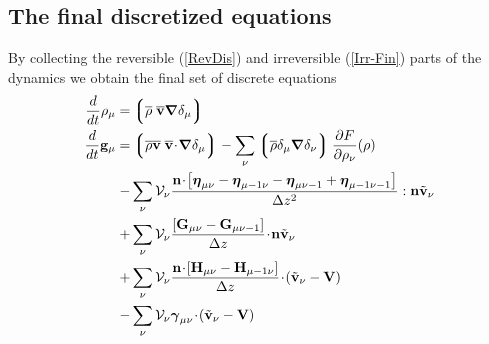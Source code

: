\documentclass[b5paper,openright,11pt]{book}
\newcommand{\esc}{\!\cdot\!}
\newcommand{\llg}{\left\lgroup}
\newcommand{\rlg}{\right\rgroup}
\begin{document}
\subsection{The final discretized equations}
By   collecting  the   reversible   (\ref{RevDis})  and   irreversible
(\ref{Irr-Fin})  parts of  the dynamics  we  obtain the  final set  of
discrete equations
\begin{align}
\frac{d}{dt}\rho_\mu=&  \llg\overline{\rho} \; \overline{\bf v}\boldsymbol{\nabla}\delta_\mu \rlg
\nonumber\\
\frac{d}{dt}{\bf g}_\mu=&
\llg\overline{\rho} \overline{\bf v}\;\overline{\bf v}\esc\boldsymbol{\nabla}\delta_{\mu}\rlg
-\sum_\nu\llg\overline{\rho}\delta_{\mu}\boldsymbol{\nabla}\delta_{\nu}\rlg
\frac{\partial  F}{\partial \rho_{\nu}}(\rho)
\nonumber\\
-&\sum_{\nu}{\cal V}_\nu \frac{{\bf n}\esc\left[\boldsymbol{\eta}_{\mu\nu}-\boldsymbol{\eta}_{\mu-1\nu}-\boldsymbol{\eta}_{\mu\nu-1}+\boldsymbol{\eta}_{\mu-1\nu-1}\right]}{\Delta z^2}:{\bf n}\tilde{\bf v}_\nu
\nonumber\\
+&\sum_{\nu}{\cal V}_\nu\frac{\left[{\bf G}_{\mu\nu}-{\bf G}_{\mu\nu-1}\right]}{\Delta z}\esc{\bf n}\tilde{\bf v}_\nu
\nonumber\\
+&\sum_{\nu}{\cal V}_\nu\frac{{\bf n}\esc\left[{\bf H}_{\mu\nu}-{\bf H}_{\mu-1\nu}\right]}{\Delta z}\esc(\tilde{\bf v}_\nu-{\bf V})
\nonumber\\
-&\sum_{\nu}{\cal V}_\nu\boldsymbol{\gamma}_{\mu\nu}\esc(\tilde{\bf v}_\nu-{\bf V})
\label{TheoryDiscFin}
\end{align}
\end{document}
